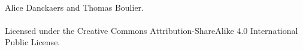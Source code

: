 ~\vfill
\thispagestyle{empty}

\noindent {} Alice Danckaers and Thomas Boulier.\\\\ %



\noindent Licensed under the Creative Commons Attribution-ShareAlike 4.0 International Public License.\\ %

